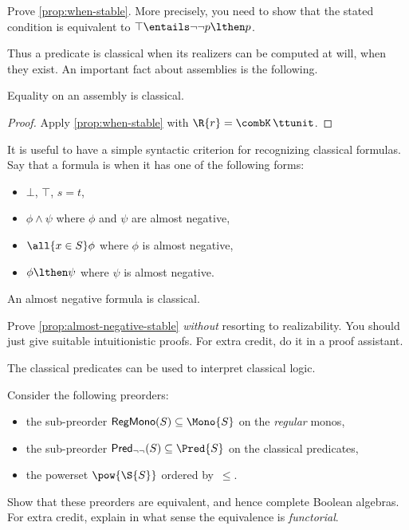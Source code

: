 \begin{exercise}
  Prove \cref{prop:when-stable}. More precisely, you need to show that the stated condition is equivalent to $\top \entails \lnot\lnot p \lthen p$.
\end{exercise}

Thus a predicate is classical when its realizers can be computed at will, when they exist.
%
An important fact about assemblies is the following.

\begin{proposition}
  Equality on an assembly is classical.
\end{proposition}

\begin{proof}
  Apply \cref{prop:when-stable} with $\R{r} = \combK\,\ttunit$.
\end{proof}

It is useful to have a simple syntactic criterion for recognizing classical formulas. Say that a formula is  when it has one of the following forms:
%
\begin{itemize}
\item $\bot$, $\top$, $s = t$,
\item $\phi \land \psi$ where $\phi$ and $\psi$ are almost negative,
\item $\all{x \in S} \phi$ where $\phi$ is almost negative,
\item $\phi \lthen \psi$ where $\psi$ is almost negative.
\end{itemize}

\begin{proposition}
  \label{prop:almost-negative-stable}
  An almost negative formula is classical.
\end{proposition}

\begin{exercise}
  Prove \cref{prop:almost-negative-stable} \emph{without} resorting to realizability. You should just give suitable intuitionistic proofs. For extra credit, do it in a proof assistant.
\end{exercise}

The classical predicates can be used to interpret classical logic.

\begin{exercise}
  Consider the following preorders:
  \begin{itemize}
  \item the sub-preorder $\mathsf{RegMono}(S) \subseteq \Mono{S}$ on the \emph{regular} monos,
  \item the sub-preorder $\mathsf{Pred}_{\lnot\lnot}(S) \subseteq \Pred{S}$ on the classical predicates,
  \item the powerset $\pow{\S{S}}$ ordered by~$\leq$.
  \end{itemize}
  Show that these preorders are equivalent, and hence complete Boolean algebras.
  For extra credit, explain in what sense the equivalence is \emph{functorial}.
\end{exercise}


